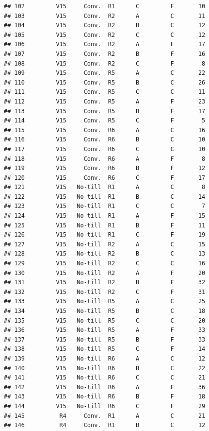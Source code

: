 \documentclass[
]{article}
\begin{document}
\begin{verbatim}
## 102         V15     Conv.  R1      C         F       10
## 103         V15     Conv.  R2      A         C       11
## 104         V15     Conv.  R2      B         C       12
## 105         V15     Conv.  R2      C         C       12
## 106         V15     Conv.  R2      A         F       17
## 107         V15     Conv.  R2      B         F       16
## 108         V15     Conv.  R2      C         F        8
## 109         V15     Conv.  R5      A         C       22
## 110         V15     Conv.  R5      B         C       26
## 111         V15     Conv.  R5      C         C       11
## 112         V15     Conv.  R5      A         F       23
## 113         V15     Conv.  R5      B         F       17
## 114         V15     Conv.  R5      C         F        5
## 115         V15     Conv.  R6      A         C       16
## 116         V15     Conv.  R6      B         C       10
## 117         V15     Conv.  R6      C         C       10
## 118         V15     Conv.  R6      A         F        8
## 119         V15     Conv.  R6      B         F       12
## 120         V15     Conv.  R6      C         F       17
## 121         V15   No-till  R1      A         C        8
## 122         V15   No-till  R1      B         C       14
## 123         V15   No-till  R1      C         C        7
## 124         V15   No-till  R1      A         F       15
## 125         V15   No-till  R1      B         F       11
## 126         V15   No-till  R1      C         F       19
## 127         V15   No-till  R2      A         C       15
## 128         V15   No-till  R2      B         C       13
## 129         V15   No-till  R2      C         C       16
## 130         V15   No-till  R2      A         F       20
## 131         V15   No-till  R2      B         F       32
## 132         V15   No-till  R2      C         F       31
## 133         V15   No-till  R5      A         C       25
## 134         V15   No-till  R5      B         C       18
## 135         V15   No-till  R5      C         C       20
## 136         V15   No-till  R5      A         F       33
## 137         V15   No-till  R5      B         F       33
## 138         V15   No-till  R5      C         F       14
## 139         V15   No-till  R6      A         C       12
## 140         V15   No-till  R6      B         C       22
## 141         V15   No-till  R6      C         C       21
## 142         V15   No-till  R6      A         F       36
## 143         V15   No-till  R6      B         F       18
## 144         V15   No-till  R6      C         F       29
## 145          R4     Conv.  R1      A         C       21
## 146          R4     Conv.  R1      B         C       12

\end{verbatim}
\end{document}
